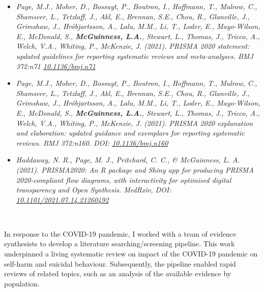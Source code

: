 \documentclass[a4paper, twoside]{templates/ociamthesis}
\begin{document}
\begin{itemize}
\item
  \emph{Page, M.J., Moher, D., Bossuyt, P., Boutron, I., Hoffmann, T., Mulrow, C., Shamseer, L., Tetzlaff, J., Akl, E., Brennan, S.E., Chou, R., Glanville, J., Grimshaw, J., Hróbjartsson, A., Lalu, M.M., Li, T., Loder, E., Mayo-Wilson, E., McDonald, S., \textbf{McGuinness, L.A.}, Stewart, L., Thomas, J., Tricco, A., Welch, V.A., Whiting, P., McKenzie, J. (2021). PRISMA 2020 statement: updated guidelines for reporting systematic reviews and meta-analyses. BMJ 372:n71 \href{https://doi.org/10.1136/bmj.n71}{10.1136/bmj.n71}}
\item
  \emph{Page, M.J., Moher, D., Bossuyt, P., Boutron, I., Hoffmann, T., Mulrow, C., Shamseer, L., Tetzlaff, J., Akl, E., Brennan, S.E., Chou, R., Glanville, J., Grimshaw, J., Hróbjartsson, A., Lalu, M.M., Li, T., Loder, E., Mayo-Wilson, E., McDonald, S., \textbf{McGuinness, L.A.}, Stewart, L., Thomas, J., Tricco, A., Welch, V.A., Whiting, P., McKenzie, J. (2021). PRISMA 2020 explanation and elaboration: updated guidance and exemplars for reporting systematic reviews. BMJ 372:n160. DOI: \href{https://doi.org/10.1136/bmj.n160}{10.1136/bmj.n160}}
\item
  \emph{Haddaway, N. R., Page, M. J., Pritchard, C. C., \& McGuinness, L. A. (2021). PRISMA2020: An R package and Shiny app for producing PRISMA 2020-compliant flow diagrams, with interactivity for optimised digital transparency and Open Synthesis. MedRxiv, DOI: \href{https://doi.org/10.1101/2021.07.14.21260492}{10.1101/2021.07.14.21260492}}
\end{itemize}

~

In response to the COVID-19 pandemic, I worked with a team of evidence synthesists to develop a literature searching/screening pipeline. This work underpinned a living systematic review on impact of the COVID-19 pandemic on self-harm and suicidal behaviour. Subsequently, the pipeline enabled rapid reviews of related topics, such as an analysis of the available evidence by population.
\end{document}
